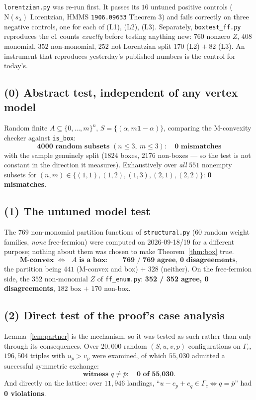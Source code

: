 \documentclass[11pt]{article}
\theoremstyle{definition}
\newcommand{\N}{\mathrm{N}}
\begin{document}
\texttt{lorentzian.py} was re-run first. It passes its $16$ untuned positive controls
($\N(s_\lambda)$ Lorentzian, HMMS \texttt{1906.09633} Theorem 3) and fails correctly on
three negative controls, one for each of (L1), (L2), (L3). Separately,
\texttt{boxtest\_ff.py} reproduces the c1 counts \emph{exactly} before testing anything new:
$760$ nonzero $Z$, $408$ monomial, $352$ non-monomial, $252$ not Lorentzian split
$170$ (L2) $+\ 82$ (L3). An instrument that reproduces yesterday's published numbers is
the control for today's.

\subsection*{(0) Abstract test, independent of any vertex model}

Random finite $A\subseteq\{0,\dots,m\}^n$, $S=\{(\alpha,m\mathbf1-\alpha)\}$, comparing the
M-convexity checker against \texttt{is\_box}:
\[
\textbf{4000 random subsets } (n\le3,\ m\le3):\quad \textbf{0 mismatches}
\]
with the sample genuinely split ($1824$ boxes, $2176$ non-boxes --- so the test is not
constant in the direction it measures). Exhaustively over \emph{all} $551$ nonempty
subsets for $(n,m)\in\{(1,1),(1,2),(1,3),(2,1),(2,2)\}$: \textbf{0 mismatches}.

\subsection*{(1) The untuned model test}

The $769$ non-monomial partition functions of \texttt{structural.py} ($60$ random
weight families, \emph{none} free-fermion) were computed on 2026-09-18/19 for a different
purpose; nothing about them was chosen to make Theorem~\ref{thm:box} true.
\[
\textbf{M-convex }\Longleftrightarrow\textbf{ }A\textbf{ is a box}:\qquad
\textbf{769 / 769 agree, 0 disagreements},
\]
the partition being $441$ (M-convex and box) $+$ $328$ (neither). On the free-fermion side,
the $352$ non-monomial $Z$ of \texttt{ff\_enum.py}: \textbf{352 / 352 agree, 0
disagreements}, $182$ box $+$ $170$ non-box.

\subsection*{(2) Direct test of the proof's case analysis}

Lemma~\ref{lem:partner} is the mechanism, so it was tested as such rather than only through
its consequences. Over $20{,}000$ random $(S,u,v,p)$ configurations on $\Gamma_c$,
$196{,}504$ triples with $u_p>v_p$ were examined, of which $55{,}030$ admitted a successful
symmetric exchange:
\[
\textbf{witness }q\ne\bar p:\quad \textbf{0 of 55{,}030}.
\]
And directly on the lattice: over $11{,}946$ landings, ``$u-e_p+e_q\in\Gamma_c
\iff q=\bar p$'' had \textbf{0 violations}.
\end{document}
